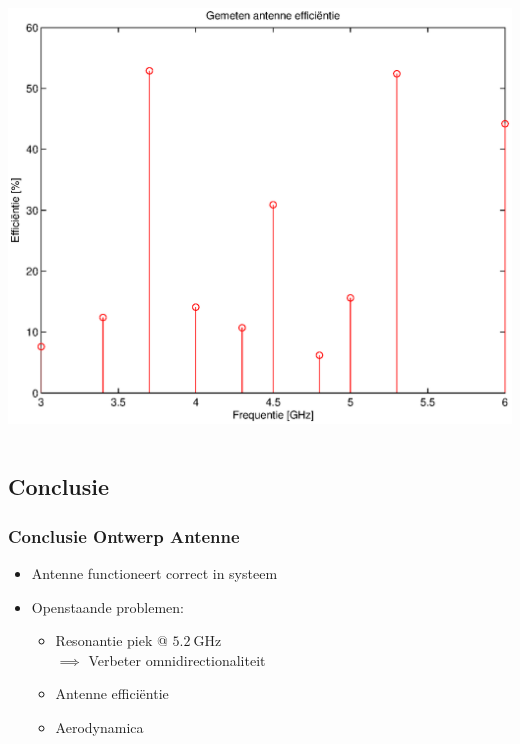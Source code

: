 \documentclass{beamer}
\begin{document}
\begin{frame}
\begin{columns}
\begin{column}{0.5\textwidth}
      \includegraphics[width=\textwidth]{images/ant_eff}
    \end{column}
    \end{columns}
  \end{frame}

\subsection{Conclusie}
  \begin{frame}
  \frametitle{Conclusie Ontwerp Antenne}
    \begin{itemize}
      \item Antenne functioneert correct in systeem
      \item Openstaande problemen:
      \begin{itemize}
        \item Resonantie piek @ $\SI{5.2}{\giga\hertz}$ \\ $\implies$ Verbeter omnidirectionaliteit
        \item Antenne effici\"entie
        \item Aerodynamica
      \end{itemize}
    \end{itemize}

  \end{frame}
\end{document}
